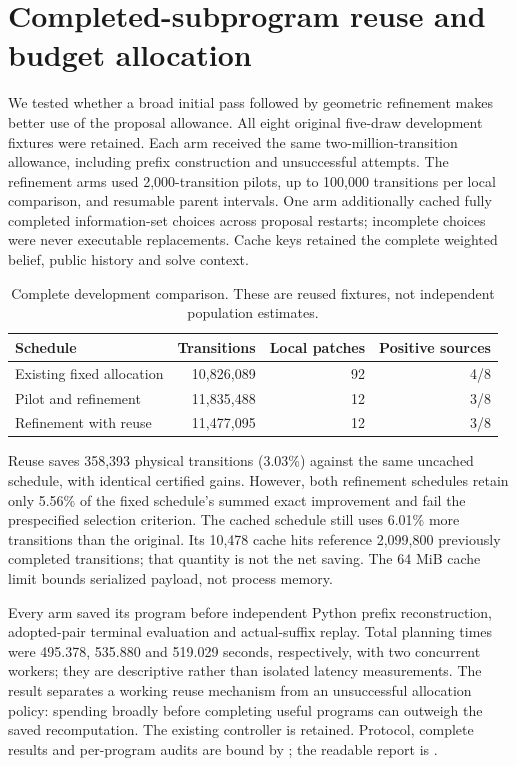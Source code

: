 \section{Completed-subprogram reuse and budget allocation}
\label{app:search-reuse}
We tested whether a broad initial pass followed by geometric refinement makes
better use of the proposal allowance. All eight original five-draw development
fixtures were retained. Each arm received the same two-million-transition
allowance, including prefix construction and unsuccessful attempts. The
refinement arms used 2,000-transition pilots, up to 100,000 transitions per
local comparison, and resumable parent intervals. One arm additionally cached
fully completed information-set choices across proposal restarts; incomplete
choices were never executable replacements. Cache keys retained the complete
weighted belief, public history and solve context.

\begin{table}[ht]
\centering\small
\begin{tabular}{lrrr}
\toprule
Schedule & Transitions & Local patches & Positive sources \\
\midrule
Existing fixed allocation & 10,826,089 & 92 & 4/8 \\
Pilot and refinement & 11,835,488 & 12 & 3/8 \\
Refinement with reuse & 11,477,095 & 12 & 3/8 \\
\bottomrule
\end{tabular}
\caption{Complete development comparison. These are reused fixtures, not
independent population estimates.}
\label{tab:reuse-development}
\end{table}

Reuse saves 358,393 physical transitions (3.03\%) against the same uncached
schedule, with identical certified gains. However, both refinement schedules
retain only 5.56\% of the fixed schedule's summed exact improvement and fail
the prespecified selection criterion. The cached schedule still uses 6.01\%
more transitions than the original. Its 10,478 cache hits reference 2,099,800
previously completed transitions; that quantity is not the net saving.
The 64 MiB cache limit bounds serialized payload, not process memory.

Every arm saved its program before independent Python prefix reconstruction,
adopted-pair terminal evaluation and actual-suffix replay. Total planning times
were 495.378, 535.880 and 519.029 seconds, respectively, with two concurrent
workers; they are descriptive rather than isolated latency measurements.
The result separates a working reuse mechanism from an unsuccessful allocation
policy: spending broadly before completing useful programs can outweigh the
saved recomputation. The existing controller is retained. Protocol, complete
results and per-program audits are bound by
; the readable report is
.
